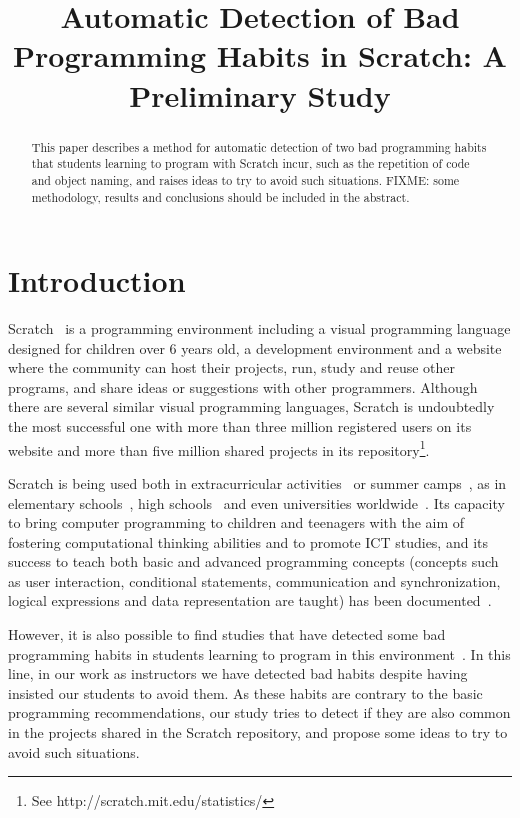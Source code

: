 \documentclass[conference]{format/IEEEtran}
\title{Automatic Detection of Bad Programming Habits in Scratch: A Preliminary Study}
\author{\IEEEauthorblockN{Jesús Moreno}
\IEEEauthorblockA{INTEF \& Programamos.es\\
Madrid, Spain\\
jesus.moreno@programamos.es}
\and
\IEEEauthorblockN{Gregorio Robles}
\IEEEauthorblockA{GSyC/LibreSoft\\Universidad Rey Juan Carlos\\
Madrid, Spain\\
grex@gsyc.urjc.es}}
\begin{document}
\maketitle

\begin{abstract}
This paper describes a method for automatic detection of two bad programming habits that students learning to program with Scratch incur, such as the repetition of code and object naming, and raises ideas to try to avoid such situations. FIXME: some methodology, results and conclusions should be included in the abstract.

\end{abstract}

\section{Introduction}

Scratch~\cite{resnick2009scratch}  is a programming environment including a visual programming language designed for children over 6 years old, a development environment and a website where the community can host their projects, run, study and reuse other programs, and share ideas or suggestions with other programmers. Although there are several similar visual programming languages, Scratch is undoubtedly the most successful one with more than three million registered users on its website and more than five million shared projects in its repository\footnote{See http://scratch.mit.edu/statistics/}.

Scratch is being used both in extracurricular activities~\cite{kafai2010entering} or summer camps~\cite{adams2010scratching}, as in elementary schools~\cite{wilson2012evaluation}, high schools~\cite{meerbaum2013learning} and even universities worldwide~\cite{malan2007scratch}. Its capacity to bring computer programming to children and teenagers with the aim of fostering computational thinking abilities and to promote ICT studies, and its success to teach both basic and advanced programming concepts (concepts such as user interaction, conditional statements, communication and synchronization, logical expressions and data representation are taught) has been documented~\cite{maloney2008programming, franklin2013assessment, wolz2009starting}.

However, it is also possible to find studies that have detected some bad programming habits in students learning to program in this environment~\cite{meerbaum2011habits}. In this line, in our work as instructors we have detected bad habits despite having insisted our students to avoid them. As these habits are contrary to the basic programming recommendations, our study tries to detect if they are also common in the projects shared in the Scratch repository, and propose some ideas to try to avoid such situations.
\end{document}
